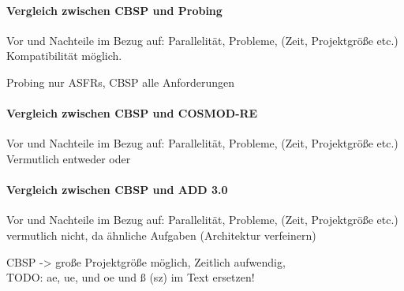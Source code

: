 \paragraph{Vergleich zwischen CBSP und Probing}
Vor und Nachteile im Bezug auf: Parallelität, Probleme, (Zeit, Projektgröße etc.)\\

Kompatibilität möglich.

Probing nur ASFRs, CBSP alle Anforderungen \\

\paragraph{Vergleich zwischen CBSP und COSMOD-RE}
Vor und Nachteile im Bezug auf: Parallelität, Probleme, (Zeit, Projektgröße etc.)\\

Vermutlich entweder oder \\

\paragraph{Vergleich zwischen CBSP und ADD 3.0}
Vor und Nachteile im Bezug auf: Parallelität, Probleme, (Zeit, Projektgröße etc.)\\

vermutlich nicht, da ähnliche Aufgaben (Architektur verfeinern) 

CBSP -> große Projektgröße möglich, Zeitlich aufwendig, \\

TODO: ae, ue, und oe und ß (sz) im Text ersetzen! \\
